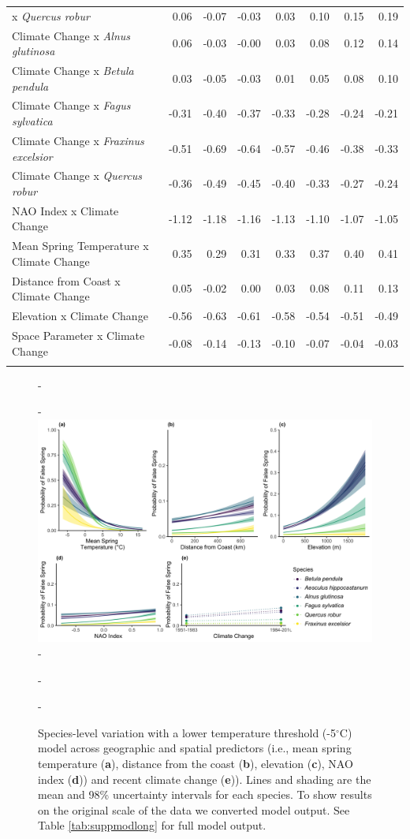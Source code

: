 \documentclass{article}\usepackage[]{graphicx}\usepackage[]{color}
\begin{document}
\begin{longtable}{lrrrrrrr}
x\textit{ Quercus robur} & 0.06 & -0.07 & -0.03 & 0.03 & 0.10 & 0.15 & 0.19 \\ 
  Climate Change
x\textit{ Alnus glutinosa} & 0.06 & -0.03 & -0.00 & 0.03 & 0.08 & 0.12 & 0.14 \\ 
  Climate Change
x\textit{ Betula pendula} & 0.03 & -0.05 & -0.03 & 0.01 & 0.05 & 0.08 & 0.10 \\ 
  Climate Change
x\textit{ Fagus sylvatica} & -0.31 & -0.40 & -0.37 & -0.33 & -0.28 & -0.24 & -0.21 \\ 
  Climate Change
x\textit{ Fraxinus excelsior} & -0.51 & -0.69 & -0.64 & -0.57 & -0.46 & -0.38 & -0.33 \\ 
  Climate Change
x\textit{ Quercus robur} & -0.36 & -0.49 & -0.45 & -0.40 & -0.33 & -0.27 & -0.24 \\ 
  NAO Index x Climate Change & -1.12 & -1.18 & -1.16 & -1.13 & -1.10 & -1.07 & -1.05 \\ 
  Mean Spring 
Temperature x Climate Change & 0.35 & 0.29 & 0.31 & 0.33 & 0.37 & 0.40 & 0.41 \\ 
  Distance from 
Coast x Climate Change & 0.05 & -0.02 & 0.00 & 0.03 & 0.08 & 0.11 & 0.13 \\ 
  Elevation x Climate Change & -0.56 & -0.63 & -0.61 & -0.58 & -0.54 & -0.51 & -0.49 \\ 
  Space Parameter x Climate Change & -0.08 & -0.14 & -0.13 & -0.10 & -0.07 & -0.04 & -0.03 \\ 
   \hline
\hline
\label{tab:suppmodfive}
\end{longtable}


{\begin{figure} [H]
  -\begin{center}
  -\includegraphics[width=12cm]{..//..//analyses/figures/InteractionPlots/Species_fivelong.png}
  -\caption{Species-level variation with a lower temperature threshold (-5$^{\circ}$C) model across geographic and spatial predictors (i.e., mean spring temperature (\textbf{a}), distance from the coast (\textbf{b}), elevation (\textbf{c}), NAO index (\textbf{d})) and recent climate change (\textbf{e})). Lines and shading are the mean and 98\% uncertainty intervals for each species. To show results on the original scale of the data we converted model output. See Table \ref{tab:suppmodlong} for full model output. }\label{fig:sppfive}
  -\end{center}
  -\end{figure}}
\end{document}
